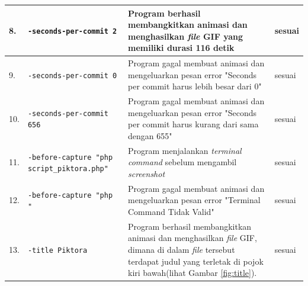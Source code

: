 \begin{table}[htbp]
\begin{tabular}{|p{0.3cm}| p{5 cm}| p{7.3 cm}| p{3 cm}|}
		8. & \texttt{-seconds-per-commit 2} & Program berhasil membangkitkan animasi dan menghasilkan \textit{file} GIF yang memiliki durasi 116 detik & sesuai \\ \hline
		9. & \texttt{-seconds-per-commit 0} & Program gagal membuat animasi dan mengeluarkan pesan error "Seconds per commit harus lebih besar dari 0" & sesuai \\ \hline
		10. & \texttt{-seconds-per-commit 656} & Program gagal membuat animasi dan mengeluarkan pesan error "Seconds per commit harus kurang dari sama dengan  655" & sesuai \\ \hline
		11. & \texttt{-before-capture "php script\_piktora.php"} & Program menjalankan \textit{terminal command} sebelum mengambil \textit{screenshot} & sesuai  \\ \hline
		12. & \texttt{-before-capture "php "} & Program gagal membuat animasi dan mengeluarkan pesan error "Terminal Command Tidak Valid" & sesuai \\ \hline
		13. & \texttt{-title Piktora}  & Program berhasil membangkitkan animasi dan menghasilkan \textit{file} GIF, dimana di dalam \textit{file} tersebut terdapat judul yang terletak di pojok kiri bawah(lihat Gambar \ref{fig:title}). & sesuai \\ \hline
		
		
		\end{tabular}
	\label{table:hasil_pengujian1}
\end{table}



